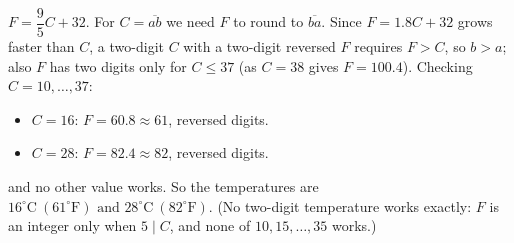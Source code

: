 $F=\dfrac{9}{5}C+32$. For $C=\overline{ab}$ we need $F$ to round to $\overline{ba}$. Since $F=1.8C+32$ grows faster than $C$, a two-digit $C$ with a two-digit reversed $F$ requires $F>C$, so $b>a$; also $F$ has two digits only for $C\le37$ (as $C=38$ gives $F=100.4$). Checking $C=10,\dots,37$:
\begin{itemize}
\item $C=16$: $F=60.8\approx61$, reversed digits. \checkmark
\item $C=28$: $F=82.4\approx82$, reversed digits. \checkmark
\end{itemize}
and no other value works. So the temperatures are $\boxed{16^\circ\text{C}\ (61^\circ\text{F})\text{ and }28^\circ\text{C}\ (82^\circ\text{F})}$. (No two-digit temperature works exactly: $F$ is an integer only when $5\mid C$, and none of $10,15,\dots,35$ works.)
